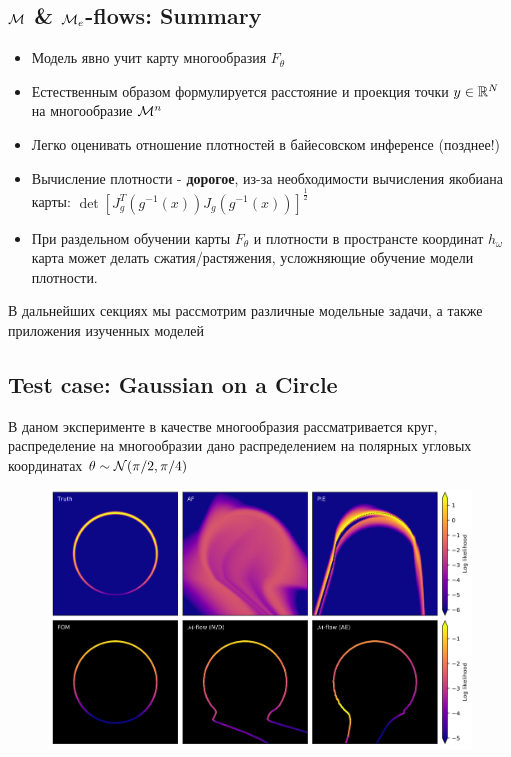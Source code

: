 \newpage

\subsection{$\mathcal{M}$ \& $\mathcal{M}_{e}$-flows: Summary}

\textbf{}
\begin{itemize}
    \item Модель явно учит карту многообразия $F_{\theta}$
    \item Естественным образом формулируется расстояние и проекция точки $y \in \mathbb{R}^N$ на многообразие $\mathcal{M}^n$
    \item Легко оценивать отношение плотностей в байесовском инференсе (позднее!)
\end{itemize}
\textbf{}
\begin{itemize}
    \item Вычисление плотности - \textbf{дорогое}, из-за необходимости вычисления якобиана карты: $\det \left[ J_g^{T}(g^{-1}(x)) J_g(g^{-1}(x))\right]^{\frac{1}{2}}$
    \item При раздельном обучении карты $F_{\theta}$ и плотности в пространсте координат $h_{\omega}$ карта может делать сжатия/растяжения, усложняющие обучение модели плотности.
\end{itemize}

В дальнейших секциях мы рассмотрим различные модельные задачи, а также приложения изученных моделей

\subsection{Test case: Gaussian on a Circle}

В даном эксперименте в качестве многообразия рассматривается круг, распределение на многообразии дано распределением на полярных угловых координатах $\theta \sim \mathcal{N}(\pi/2, \pi/4)$

\begin{figure}[h]
    \centering
    \includegraphics[width=0.7\linewidth]{chapters/petr_mokrov_s1/figs/gauss_in_circ.png}
\end{figure}

